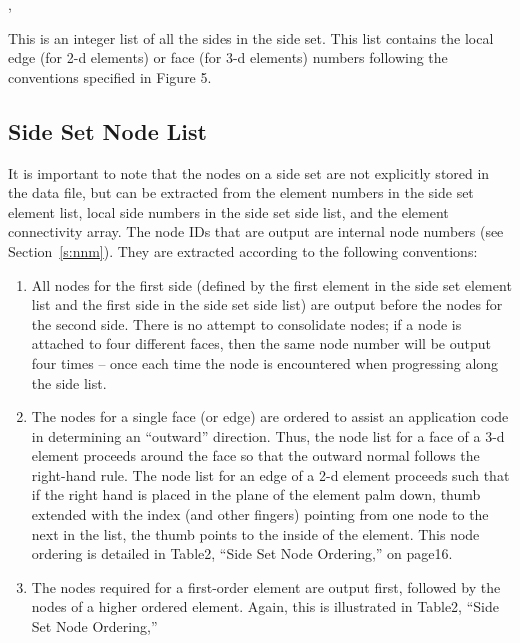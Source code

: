 \begin{spacing}{1.5}
\api {}, 
\end{spacing}

{This is an integer list of all the sides in the side set. 
This list contains the local edge (for 2-d elements) or face 
(for 3-d elements) numbers following the conventions specified 
in  Figure 5.}



\subsection{Side Set Node List}



\begin{spacing}{1.5}
\api {}
\end{spacing}

It is important to note that the nodes on a side set are 
not explicitly stored in the data file, but can be extracted 
from the element numbers in the side set element list, local 
side numbers in the side set side list, and the element connectivity 
array. The node IDs that are output are internal node numbers 
(see  Section~\ref{s:nnm}). They are extracted according to 
the following conventions:


\begin{enumerate}
\item {All nodes for the first side (defined by the first element 
in the side set element list and the first side in the side set side
list) are output before the nodes for the second side. There is no
attempt to consolidate nodes; if a node is attached to four different
faces, then the same node number will be output four times -- once
each time the node is encountered when progressing along the side
list.}

\item {The nodes for a single face (or edge) are ordered to assist 
an application code in determining an ``outward'' direction. Thus, the
node list for a face of a 3-d element proceeds around the face so that
the outward normal follows the right-hand rule. The node list for an
edge of a 2-d element proceeds such that if the right hand is placed
in the plane of the element palm down, thumb extended with the index
(and other fingers) pointing from one node to the next in the list,
the thumb points to the inside of the element. This node ordering is
detailed in Table{\nobreakspace}2, ``Side Set Node Ordering,'' on
page{\nobreakspace}16.}

\item {The nodes required for a first-order element are output 
first, followed by the nodes of a higher ordered element. Again, this
is illustrated in Table{\nobreakspace}2, ``Side Set Node Ordering,'' }
\end{enumerate}

